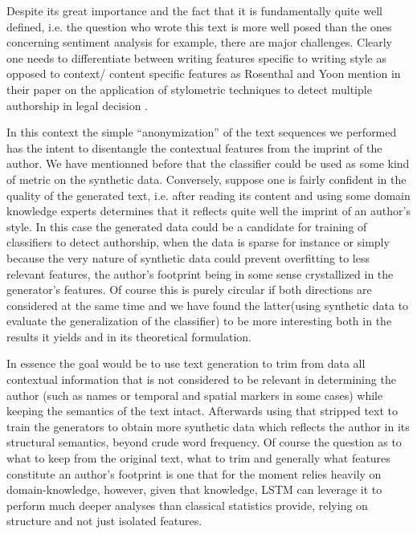 Despite its great importance and the fact that it is fundamentally
quite well defined, i.e. the question who wrote this text
is more well posed than the ones concerning sentiment analysis for
example, there are major challenges. Clearly one needs to differentiate
between writing features specific to writing style as opposed to
context/ content specific features as Rosenthal and Yoon mention in 
their paper on the application of stylometric techniques to detect
multiple authorship in legal decision .

In this context the simple ``anonymization'' of the text sequences we performed
has the intent to disentangle the contextual features from the imprint of the
author. We have mentionned before that the classifier could be used as some
kind of metric on the synthetic data. Conversely, suppose one is fairly
confident in the quality of the generated text, i.e. after reading its content
and using some domain knowledge experts determines that it reflects quite well
the imprint of an author's style. In this case the generated data could be a
candidate for training of classifiers to detect authorship, when the data is
sparse for instance or simply because the very nature of synthetic data could
prevent overfitting to less relevant features, the author's footprint being in
some sense crystallized in the generator's features. Of course this is purely
circular if both directions are considered at the same time and we have found
the latter(using synthetic data to evaluate the generalization of the
classifier) to be more interesting both in the results it yields and in its
theoretical formulation.

In essence the goal would be to use text generation to trim from data all
contextual information that is not considered to be relevant in determining the
author (such as names or temporal and spatial markers in some cases) while
keeping the semantics of the text intact. Afterwards using that stripped text
to train the generators to obtain more synthetic data which reflects the author
in its structural semantics, beyond crude word frequency.  Of course the
question as to what to keep from the original text, what to trim and generally
what features constitute an author's footprint is one that for the moment
relies heavily on domain-knowledge, however, given that knowledge, LSTM can
leverage it to perform much deeper analyses than classical statistics provide,
relying on structure and not just isolated features.




